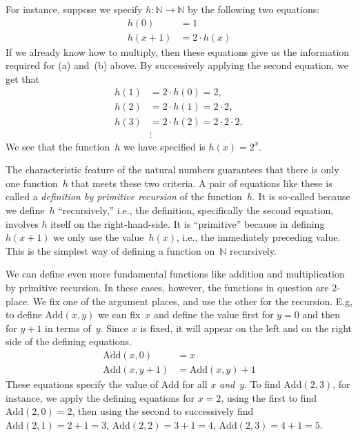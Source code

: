 \documentclass[10pt,a4paper]{article}
\theoremstyle{plain}
\theoremstyle{definition}
\theoremstyle{remark}
\providecommand{\Nat}{\ensuremath{\mathbb{N}}}
\providecommand{\Add}{\ensuremath{\mathrm{Add}}}
\begin{document}
For instance, suppose we specify $h\colon \Nat \to \Nat$ by the following
two equations:
\begin{align*}
h(0) & =  1\\
h(x+1) & =  2 \cdot h(x)
\end{align*}
If we already know how to multiply, then these equations give us the
information required for (a) and~(b) above. By successively applying
the second equation, we get that
\begin{align*}
  h(1) & = 2\cdot h(0) = 2,\\
  h(2) & = 2\cdot h(1) = 2\cdot 2,\\
  h(3) & = 2 \cdot h(2) = 2\cdot 2 \cdot 2,\\
  & \vdots
\end{align*}
We see that the function~$h$ we have specified is $h(x) = 2^x$.

The characteristic feature of the natural numbers guarantees that
there is only one function~$h$ that meets these two criteria.  A pair
of equations like these is called a \emph{definition by primitive
recursion} of the function~$h$. It is so-called because we define~$h$
``recursively,'' i.e., the definition, specifically the second
equation, involves $h$ itself on the right-hand-side. It is
``primitive'' because in defining $h(x+1)$ we only use the
value~$h(x)$, i.e., the immediately preceding value. This is the
simplest way of defining a function on~$\Nat$ recursively.

We can define even more fundamental functions like addition and
multiplication by primitive recursion. In these cases, however, the
functions in question are $2$-place. We fix one of the argument
places, and use the other for the recursion. E.g, to define
$\Add(x, y)$ we can fix~$x$ and define the value first for $y=0$
and then for $y+1$ in terms of~$y$. Since $x$ is fixed, it will appear
on the left and on the right side of the defining equations.
\begin{align*}
\Add(x,0) & =  x\\
\Add(x,y+1) & =  \Add(x,y)+1
\end{align*}
These equations specify the value of $\Add$ for all $x$
\emph{and}~$y$. To find $\Add(2,3)$, for instance, we apply the
defining equations for $x = 2$, using the first to find
$\Add(2,0) = 2$, then using the second to successively find
$\Add(2,1) = 2 + 1 = 3$, $\Add(2, 2) = 3 + 1 = 4$, $\Add(2,
3) = 4 + 1 = 5$.
\end{document}
